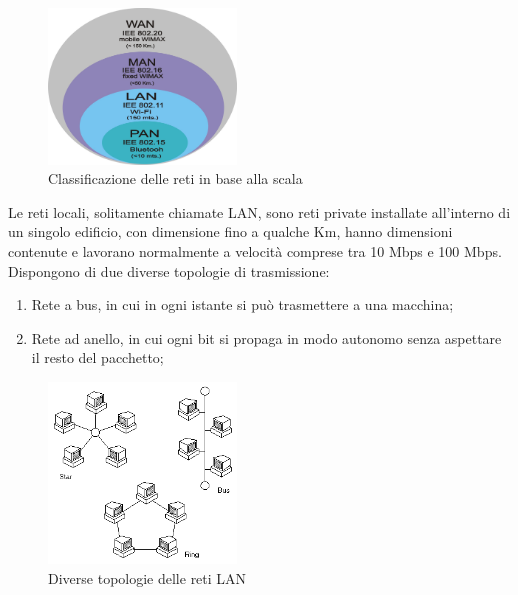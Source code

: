 \begin{figure}[htbp]
\centering
\includegraphics[width=50mm]{images/scala-reti.jpg}
\caption{Classificazione delle reti in base alla scala}
\end{figure}

Le reti locali, solitamente chiamate LAN, sono reti private installate all'interno di un singolo edificio, con dimensione fino a qualche Km, hanno dimensioni contenute e lavorano normalmente a velocità comprese tra 10 Mbps e 100 Mbps. Dispongono di due diverse topologie di trasmissione:

\begin{enumerate}

\item Rete a bus, in cui in ogni istante si può trasmettere a una macchina;
\item Rete ad anello, in cui ogni bit si propaga in modo autonomo senza aspettare il resto del pacchetto;

\end{enumerate}

\begin{figure}[htbp]
\centering
\includegraphics[width=50mm]{images/lan-topologia.png}
\caption{Diverse topologie delle reti LAN}
\end{figure}

